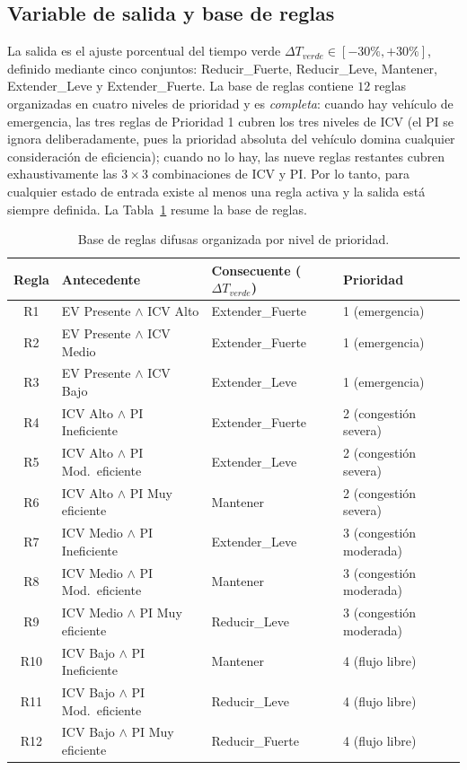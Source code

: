 \subsection{Variable de salida y base de reglas}\label{subsec:fuzzy-reglas}

La salida es el ajuste porcentual del tiempo verde $\Delta T_{verde}\in[-30\%,+30\%]$, definido
mediante cinco conjuntos: Reducir\_Fuerte, Reducir\_Leve, Mantener, Extender\_Leve y
Extender\_Fuerte. La base de reglas contiene $12$ reglas organizadas en cuatro niveles de
prioridad y es \emph{completa}: cuando hay vehículo de emergencia, las tres reglas de Prioridad
1 cubren los tres niveles de ICV (el PI se ignora deliberadamente, pues la prioridad absoluta
del vehículo domina cualquier consideración de eficiencia); cuando no lo hay, las nueve reglas
restantes cubren exhaustivamente las $3\times 3$ combinaciones de ICV y PI. Por lo tanto, para
cualquier estado de entrada existe al menos una regla activa y la salida está siempre definida.
La Tabla~\ref{tab:reglas-difusas} resume la base de reglas.

\begin{table}[H]
  \centering
  \caption{Base de reglas difusas organizada por nivel de prioridad.}
  \label{tab:reglas-difusas}
  \begin{tabular}{@{}clll@{}}
    \toprule
    \textbf{Regla} & \textbf{Antecedente} & \textbf{Consecuente ($\Delta T_{verde}$)} & \textbf{Prioridad}\\
    \midrule
    R1 & EV Presente $\land$ ICV Alto & Extender\_Fuerte & 1 (emergencia)\\
    R2 & EV Presente $\land$ ICV Medio & Extender\_Fuerte & 1 (emergencia)\\
    R3 & EV Presente $\land$ ICV Bajo & Extender\_Leve & 1 (emergencia)\\
    \midrule
    R4 & ICV Alto $\land$ PI Ineficiente & Extender\_Fuerte & 2 (congestión severa)\\
    R5 & ICV Alto $\land$ PI Mod.\ eficiente & Extender\_Leve & 2 (congestión severa)\\
    R6 & ICV Alto $\land$ PI Muy eficiente & Mantener & 2 (congestión severa)\\
    \midrule
    R7 & ICV Medio $\land$ PI Ineficiente & Extender\_Leve & 3 (congestión moderada)\\
    R8 & ICV Medio $\land$ PI Mod.\ eficiente & Mantener & 3 (congestión moderada)\\
    R9 & ICV Medio $\land$ PI Muy eficiente & Reducir\_Leve & 3 (congestión moderada)\\
    \midrule
    R10 & ICV Bajo $\land$ PI Ineficiente & Mantener & 4 (flujo libre)\\
    R11 & ICV Bajo $\land$ PI Mod.\ eficiente & Reducir\_Leve & 4 (flujo libre)\\
    R12 & ICV Bajo $\land$ PI Muy eficiente & Reducir\_Fuerte & 4 (flujo libre)\\
    \bottomrule
  \end{tabular}
\end{table}

